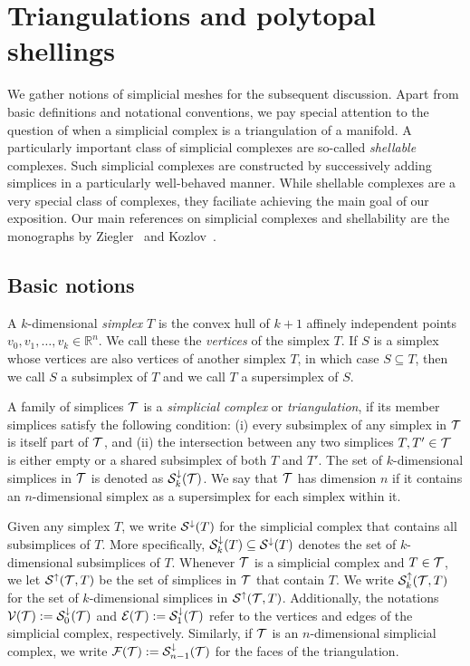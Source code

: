 \documentclass[a4paper]{amsart}
\begin{document}
\cite{ern2021finite}

\section{Triangulations and polytopal shellings}

We gather notions of simplicial meshes for the subsequent discussion. 
Apart from basic definitions and notational conventions, we pay special attention to the question of when a simplicial complex is a triangulation of a manifold. 
A particularly important class of simplicial complexes are so-called \emph{shellable} complexes. Such simplicial complexes are constructed by successively adding simplices in a particularly well-behaved manner. While shellable complexes are a very special class of complexes, they faciliate achieving the main goal of our exposition.
Our main references on simplicial complexes and shellability are the monographs by Ziegler~\cite{ziegler2012lectures} and Kozlov~\cite{kozlov2008combinatorial}. 


\subsection{Basic notions}

A ${k}$-dimensional \emph{simplex} $T$ is the convex hull of ${k}+1$ affinely independent points $v_0, v_1, \ldots, v_{{k}} \in \mathbb{R}^{n}$. We call these the \emph{vertices} of the simplex $T$. 
If $S$ is a simplex whose vertices are also vertices of another simplex $T$, in which case $S \subseteq T$, 
then we call $S$ a subsimplex of $T$ and we call $T$ a supersimplex of $S$. 

A family of simplices ${\mathcal T}$ is a \emph{simplicial complex} or \emph{triangulation}, if its member simplices satisfy the following condition: 
(i) every subsimplex of any simplex in ${\mathcal T}$ is itself part of ${\mathcal T}$, and (ii) the intersection between any two simplices $T, T' \in {\mathcal T}$ is either empty or a shared subsimplex of both $T$ and $T'$. 
The set of $k$-dimensional simplices in ${\mathcal T}$ is denoted as ${\mathcal S}^{\downarrow}_{{k}}({\mathcal T})$. 
We say that ${\mathcal T}$ has dimension $n$ if it contains an $n$-dimensional simplex as a supersimplex for each simplex within it. 

Given any simplex $T$, we write ${\mathcal S}^{\downarrow}(T)$ for the simplicial complex that contains all subsimplices of $T$. 
More specifically, ${\mathcal S}^{\downarrow}_{{k}}(T) \subseteq {\mathcal S}^{\downarrow}(T)$ denotes the set of $k$-dimensional subsimplices of $T$. 
Whenever ${\mathcal T}$ is a simplicial complex and $T \in {\mathcal T}$, we let ${\mathcal S}^{\uparrow}({\mathcal T},T)$ be the set of simplices in ${\mathcal T}$ that contain $T$.
We write ${\mathcal S}^{\uparrow}_{k}({\mathcal T},T)$ for the set of $k$-dimensional simplices in ${\mathcal S}^{\uparrow}({\mathcal T},T)$. 
Additionally, the notations ${\mathcal V}({\mathcal T}) := {\mathcal S}^{\downarrow}_{0}({\mathcal T})$ and ${\mathcal E}({\mathcal T}) := {\mathcal S}^{\downarrow}_{1}({\mathcal T})$ refer to the vertices and edges of the simplicial complex, respectively. Similarly, if ${\mathcal T}$ is an $n$-dimensional simplicial complex, we write ${\mathcal F}({\mathcal T}) := {\mathcal S}^{\downarrow}_{n-1}({\mathcal T})$ for the faces of the triangulation. 
\end{document}

